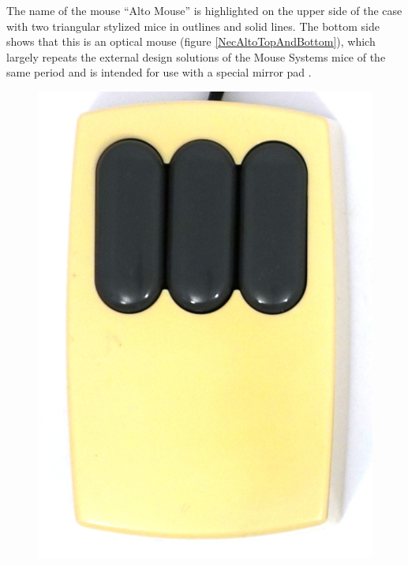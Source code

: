 \documentclass[11pt, a4paper]{article}
\begin{document}
The name of the mouse “Alto Mouse” is highlighted on the upper side of the case with two triangular stylized mice in outlines and solid lines. The bottom side shows that this is an optical mouse (figure \ref{NecAltoTopAndBottom}), which largely repeats the external design solutions of the Mouse Systems mice of the same period and is intended for use with a special mirror pad \cite{photo}.

\begin{figure}[h]
    \centering
    \includegraphics[scale=0.5]{1981_xerox_alto_mouse/top_30.jpg}

\end{figure}
\end{document}
